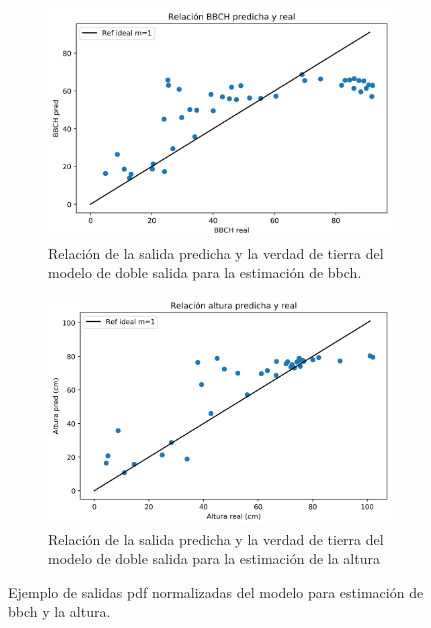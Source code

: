 \begin{figure}[H]
\centering
\begin{subfigure}{\textwidth}
  \centering
  \includegraphics[width=0.95\linewidth]{archivos/tfg/Pixel/BBCHH_RELACION_BIEN_b}
  \caption{Relación de la salida predicha y la verdad de tierra del modelo de doble salida para la estimación de \gls{bbch}. \label{fig:p_rel_bh_b}}
\end{subfigure}
\begin{subfigure}{\textwidth}
  \centering
  \includegraphics[width=0.95\linewidth]{archivos/tfg/Pixel/BBCHH_RELACION_BIEN_H}
  \caption{Relación de la salida predicha y la verdad de tierra del modelo de doble salida para la estimación de la altura\label{fig:p_rel_bh_h}}
\end{subfigure}
\caption{Ejemplo de salidas \gls{pdf} normalizadas del modelo para estimación de \gls{bbch} y la altura. \label{fig:p_rel_bh}}
\end{figure}

